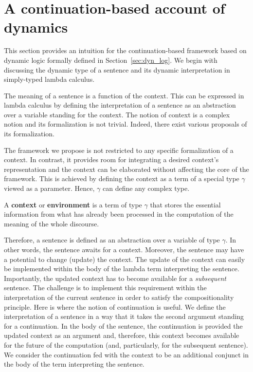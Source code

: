 \section{A continuation-based account of dynamics} \label{sec:cont_based_dyn}

 
This section provides an intuition for the continuation-based framework based on dynamic logic formally defined in Section~\ref{sec:dyn_log}. We begin with discussing the dynamic type of a sentence and its dynamic interpretation in simply-typed lambda calculus. 
 
The meaning of a sentence is a function of the context. This can be expressed in lambda calculus by defining the interpretation of a sentence as an abstraction over a variable standing for the context. The notion of context is a complex notion and its formalization is not trivial. Indeed, there exist various proposals of its formalization.  

The framework we propose is not restricted to any specific formalization of a context. In contrast, it provides room for integrating a desired context's representation and the context can be elaborated without affecting the core of the framework. This is achieved by defining the context as a term of a special type $\gamma$ viewed as a parameter. Hence, $\gamma$ can define any complex type.


\begin{definition} A \textbf{context} or \textbf{environment} is a term of type $\gamma$ that stores the essential information from what has already been processed in the computation of the meaning of the whole discourse.
\end{definition}

Therefore, a sentence is defined as an abstraction over a variable of type $\gamma$. In other words, the sentence awaits for a context. Moreover, the sentence may have a potential to change (update) the context. The update of the context can easily be implemented within the body of the lambda term interpreting the sentence. Importantly, the updated context has to become available for a \emph{subsequent} sentence. The challenge is to implement this requirement within the interpretation of the current sentence in order to satisfy the compositionality principle. Here is where the notion of continuation is useful. We define the interpretation of a sentence in a way that it takes the second argument standing for a continuation. In the body of the sentence, the continuation is provided the updated context as an argument and, therefore, this context becomes available for the future of the computation (and, particularly, for the subsequent sentence). We consider the continuation fed with the context to be an additional conjunct in the body of the term interpreting the sentence.


